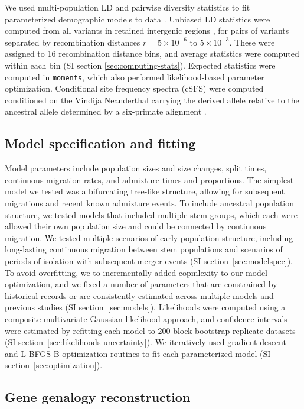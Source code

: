 \documentclass[]{article}
\begin{document}
We used multi-population LD and pairwise diversity statistics to fit
parameterized demographic models to data \citep{Ragsdale2019-nt}. Unbiased LD
statistics were computed from all variants in retained intergenic regions
\citep{Ragsdale2020-nz}, for pairs of variants separated by recombination
distances $r = 5\times10^{-6}$ to $5\times10^{-3}$. These were assigned to 16
recombination distance bins, and average statistics were computed within each
bin (SI section \ref{sec:computing-stats}). Expected statistics were computed
in \texttt{moments}, which also performed likelihood-based parameter
optimization. Conditional site frequency spectra (cSFS) were computed
conditioned on the Vindija Neanderthal carrying the derived allele relative to
the ancestral allele determined by a six-primate alignment
\citep{1000_Genomes_Project_Consortium2015-zq}.

\subsection*{Model specification and fitting}

Model parameters include population sizes and size changes, split times,
continuous migration rates, and admixture times and proportions. The simplest
model we tested was a bifurcating tree-like structure, allowing for subsequent
migrations and recent known admixture events. To include ancestral population
structure, we tested models that included multiple stem groups, which each were
allowed their own population size and could be connected by continuous
migration. We tested multiple scenarios of early population structure,
including long-lasting continuous migration between stem populations and
scenarios of periods of isolation with subsequent merger events (SI
section~\ref{sec:modelspec}). To avoid overfitting, we to incrementally added
copmlexity to our model optimization, and we fixed a number of parameters that
are constrained by historical records or are consistently estimated across
multiple models and previous studies (SI section~\ref{sec:models}). Likelihoods
were computed using a composite multivariate Gaussian likelihood approach, and
confidence intervals were estimated by refitting each model to 200
block-bootstrap replicate datasets (SI
section~\ref{sec:likelihoods-uncertainty}). We iteratively used gradient
descent and L-BFGS-B optimization routines to fit each parameterized model (SI
section~\ref{sec:optimization}).

\subsection*{Gene genalogy reconstruction}
\end{document}
